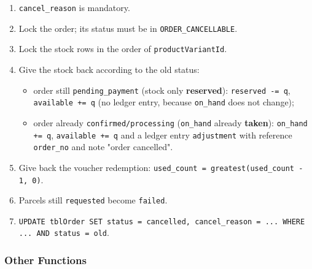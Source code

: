 \begin{enumerate}
\def\labelenumi{\arabic{enumi}.}
\tightlist
\item
  \texttt{cancel\_\allowbreak{}reason} is mandatory.
\item
  Lock the order; its status must be in \texttt{ORDER\_\allowbreak{}CANCELLABLE}.
\item
  Lock the stock rows in the order of \texttt{productVariantId}.
\item
  Give the stock back according to the old status:

  \begin{itemize}
  \tightlist
  \item
    order still \texttt{pending\_\allowbreak{}payment} (stock only
    \textbf{reserved}): \texttt{reserved -=\allowbreak{} q},
    \texttt{available +=\allowbreak{} q} (no ledger entry, because
    \texttt{on\_\allowbreak{}hand} does not change);
  \item
    order already \texttt{confirmed/\allowbreak{}processing} (\texttt{on\_\allowbreak{}hand}
    already \textbf{taken}): \texttt{on\_\allowbreak{}hand +=\allowbreak{} q},
    \texttt{available +=\allowbreak{} q} and a ledger entry \texttt{adjustment}
    with reference \texttt{order\_\allowbreak{}no} and note "order cancelled".
  \end{itemize}
\item
  Give back the voucher redemption:
  \texttt{used\_\allowbreak{}count =\allowbreak{} greatest(\allowbreak{}used\_\allowbreak{}count - 1,\allowbreak{} 0)}.
\item
  Parcels still \texttt{requested} become \texttt{failed}.
\item
  \texttt{UPDATE tblOrder SET status =\allowbreak{} \textquotesingle{}cancelled\textquotesingle{},\allowbreak{} cancel\_\allowbreak{}reason =\allowbreak{} .\allowbreak{}.\allowbreak{}.\allowbreak{} WHERE .\allowbreak{}.\allowbreak{}.\allowbreak{} AND status =\allowbreak{} old}.
\end{enumerate}

\hypertarget{other-functions}{%
\subsubsection{Other Functions}\label{other-functions}}

